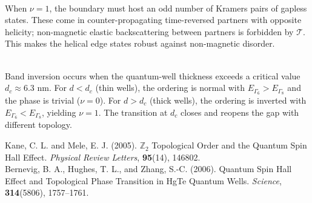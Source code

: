 \begin{technical}
\\[0.5em]
When $\nu = 1$, the boundary must host an odd number of Kramers pairs of gapless states. These come in counter-propagating time-reversed partners with opposite helicity; non-magnetic elastic backscattering between partners is forbidden by $\mathcal{T}$. This makes the helical edge states robust against non-magnetic disorder.

\\[0.5em]
Band inversion occurs when the quantum-well thickness exceeds a critical value $d_c \approx 6.3$ nm. For $d < d_c$ (thin wells), the ordering is normal with $E_{\Gamma_6} > E_{\Gamma_8}$ and the phase is trivial ($\nu = 0$). For $d > d_c$ (thick wells), the ordering is inverted with $E_{\Gamma_6} < E_{\Gamma_8}$, yielding $\nu = 1$. The transition at $d_c$ closes and reopens the gap with different topology.

\techref
{\footnotesize
Kane, C. L. and Mele, E. J. (2005). $\mathbb{Z}_2$ Topological Order and the Quantum Spin Hall Effect. \textit{Physical Review Letters}, \textbf{95}(14), 146802.\\
Bernevig, B. A., Hughes, T. L., and Zhang, S.-C. (2006). Quantum Spin Hall Effect and Topological Phase Transition in HgTe Quantum Wells. \textit{Science}, \textbf{314}(5806), 1757–1761.
}
\end{technical}
